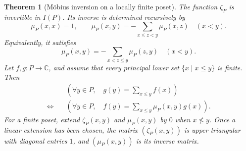 \documentclass[11pt]{article}
\theoremstyle{ntstyle}
\newtheorem{theorem}{Theorem}[subsection]
\begin{document}
\begin{theorem}[Möbius inversion on a locally finite poset]\label{thm:5.4.1}\label{thm:mobius-inversion-on-a-locally-finite-poset}
  The function $\zeta_P$ is invertible in $I(P)$. Its inverse is determined recursively by
  \[
    \mu_P(x,x)=1,\qquad
    \mu_P(x,y)=-\sum_{x\le z<y}\mu_P(x,z)\quad(x<y).
  \]
  Equivalently, it satisfies
  \[
    \mu_P(x,y)=-\sum_{x<z\le y}\mu_P(z,y)\quad(x<y).
  \]
  Let $f,g:P\to\mathbb{C}$, and assume that every principal lower set $\{x \mid x\le y\}$ is finite. Then
  \[
    \begin{aligned}
      &\left(\forall y\in P,\quad g(y)=\sum_{x\le y}f(x)\right)\\
      \Longleftrightarrow\quad
      &\left(\forall y\in P,\quad f(y)=\sum_{x\le y}\mu_P(x,y)g(x)\right).
    \end{aligned}
  \]
  For a finite poset, extend $\zeta_P(x,y)$ and $\mu_P(x,y)$ by $0$ when $x\nleq y$. Once a linear extension has
  been chosen, the matrix $(\zeta_P(x,y))$ is upper triangular with diagonal entries $1$, and $(\mu_P(x,y))$ is its
  inverse matrix.

\end{theorem}
\end{document}
